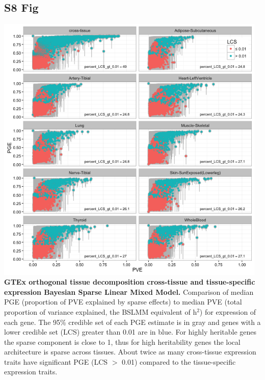 \documentclass[10pt,letterpaper]{article}
\begin{document}
\begin{singlespace}
\subsection*{S8 Fig}
\includegraphics[width=13cm]{Figures/GenArch_Supp/S5Fig.png}
\label{S8_Fig}
{\bf GTEx orthogonal tissue decomposition cross-tissue and tissue-specific expression Bayesian Sparse Linear Mixed Model.} Comparison of median PGE (proportion of PVE explained by sparse effects) to median PVE (total proportion of variance explained, the BSLMM equivalent of h$^2$) for expression of each gene. The 95\% credible set of each PGE estimate is in gray and genes with a lower credible set (LCS) greater than 0.01 are in blue. For highly heritable genes the sparse component is close to 1, thus for high heritability genes the local architecture is sparse across tissues. About twice as many cross-tissue expression traits have significant PGE (LCS $>$ 0.01) compared to the tissue-specific expression traits.


\end{singlespace}
\end{document}
